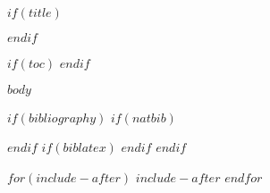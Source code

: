 \documentclass[$for(classoptions)$$classoptions$$sep$,$endfor$]{$documentclass$}
\subtitle{$subtitle$}
\begin{document}
$if(title)$\maketitle$endif$

$if(toc)$
{\hypersetup{hidelinks}\tableofcontents}
$endif$


$body$

$if(bibliography)$
$if(natbib)$


$endif$
$if(biblatex)$
\printbibliography[heading=bibintoc]
$endif$
$endif$

$for(include-after)$
$include-after$
$endfor$
\end{document}
